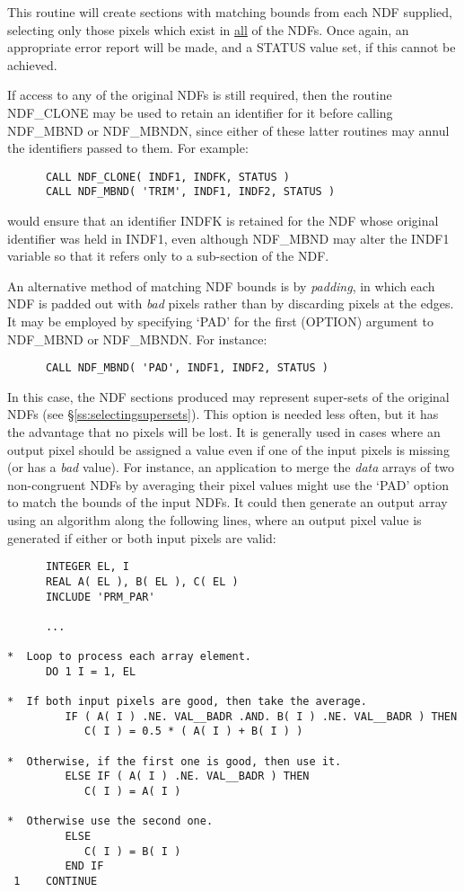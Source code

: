 \documentclass[twoside,11pt]{article}
\newcommand{\htmlref}[2]{#1}
\newcommand{\st}[1]{{\em{#1}}}
\begin{document}
This routine will create sections with matching bounds from each NDF
supplied, selecting only those pixels which exist in \underline{all} of the
NDFs. 
Once again, an appropriate error report will be made, and a STATUS value
set, if this cannot be achieved. 

If access to any of the original NDFs is still required, then the routine
\htmlref{NDF\_CLONE}{NDF_CLONE} may be used to retain an identifier for it before calling
NDF\_MBND or NDF\_MBNDN, since either of these latter routines may annul the
identifiers passed to them. 
For example:

\small
\begin{verbatim}
      CALL NDF_CLONE( INDF1, INDFK, STATUS )
      CALL NDF_MBND( 'TRIM', INDF1, INDF2, STATUS )
\end{verbatim}
\normalsize

would ensure that an identifier INDFK is retained for the NDF whose original
identifier was held in INDF1, even although NDF\_MBND may alter the INDF1
variable so that it refers only to a sub-section of the NDF.

An alternative method of matching NDF bounds is by \st{padding}, in which 
each NDF is padded out with \st{bad\/} pixels rather than by discarding 
pixels at the edges.
It may be employed by specifying `PAD' for the first (OPTION) argument to
NDF\_MBND or NDF\_MBNDN. 
For instance:

\small
\begin{verbatim}
      CALL NDF_MBND( 'PAD', INDF1, INDF2, STATUS )
\end{verbatim}
\normalsize

In this case, the NDF sections produced may represent super-sets of the
original NDFs (see \S\ref{ss:selectingsupersets}). 
This option is needed less often, but it has the advantage that no pixels
will be lost. 
It is generally used in cases where an output pixel should be assigned a
value even if one of the input pixels is missing (or has a \st{bad\/} value). 
For instance, an application to merge the \st{data\/} arrays of two
non-congruent NDFs by averaging their pixel values might use the `PAD'
option to match the bounds of the input NDFs.
It could then generate an output array using an algorithm along the
following lines, where an output pixel value is generated if either or both
input pixels are valid: 

\small
\begin{verbatim}
      INTEGER EL, I
      REAL A( EL ), B( EL ), C( EL )
      INCLUDE 'PRM_PAR'

      ...

*  Loop to process each array element.
      DO 1 I = 1, EL

*  If both input pixels are good, then take the average.
         IF ( A( I ) .NE. VAL__BADR .AND. B( I ) .NE. VAL__BADR ) THEN
            C( I ) = 0.5 * ( A( I ) + B( I ) )

*  Otherwise, if the first one is good, then use it.
         ELSE IF ( A( I ) .NE. VAL__BADR ) THEN
            C( I ) = A( I )

*  Otherwise use the second one.
         ELSE
            C( I ) = B( I )
         END IF
 1    CONTINUE
\end{verbatim}
\normalsize
\end{document}
